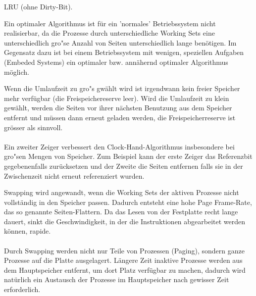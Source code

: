 \begin{answer}
  LRU (ohne Dirty-Bit).
\end{answer}

\begin{multilinequestion}
\end{multilinequestion}

\begin{answer}
  Ein optimaler Algorithmus ist für ein 'normales' Betriebssystem nicht realisierbar, da die Prozesse
  durch unterschiedliche Working Sets eine unterschiedlich gro"se Anzahl von Seiten unterschiedlich
  lange benötigen.
  Im Gegensatz dazu ist bei einem Betriebssystem mit wenigen, speziellen Aufgaben (Embeded
  Systems) ein optimaler bzw. annähernd optimaler Algorithmus möglich.
\end{answer}

\begin{answer}
  Wenn die Umlaufzeit zu gro"s gwählt wird ist irgendwann kein freier Speicher mehr verfügbar (die Freispeichereserve leer). Wird die Umlaufzeit zu klein gewählt, werden die Seiten vor ihrer nächsten Benutzung aus dem Speicher entfernt und müssen dann erneut geladen werden, die Freispeicherreserve ist grösser als sinnvoll.

  \paragraph*{}
  Ein zweiter Zeiger verbessert den Clock-Hand-Algorithmus insbesondere bei gro"sen Mengen von Speicher. Zum Beispiel kann der erste Zeiger das Referenzbit gegebenenfalls zurücksetzen und der Zweite die
  Seiten entfernen falls sie in der Zwischenzeit nicht erneut referenziert wurden.
\end{answer}

\begin{answer}
  Swapping wird angewandt, wenn die Working Sets der aktiven Prozesse nicht vollständig in den Speicher passen. Dadurch entsteht eine hohe Page Frame-Rate, das so genannte Seiten-Flattern. Da das Lesen von der Festplatte recht lange dauert, sinkt die Geschwindigkeit, in der die Instruktionen abgearbeitet werden können, rapide.

  \paragraph*{}
  Durch Swapping werden nicht nur Teile von Prozessen (Paging), sondern ganze Prozesse auf die Platte ausgelagert. Längere Zeit inaktive Prozesse werden aus dem Hauptspeicher entfernt, um dort Platz verfügbar zu machen, dadurch wird natürlich ein Austausch der Prozesse im Hauptspeicher nach gewisser Zeit erforderlich.
\end{answer}

